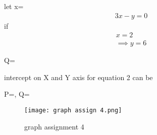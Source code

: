 \documentclass[journal,12pt,twocolumn]{IEEEtran}
\begin{document}
 let x=   
\begin{align}
 3x-y=0
 \end{align}
  if 
  \begin{align}
      x=2\\
      \implies y=6 
  \end{align}
  \begin{center}
      Q=
  \end{center}
  intercept on X and Y axis for equation 2 can be
  \begin{center}
      P=, Q=
  \end{center}
\begin{figure}[h]
    \centering
    \texttt{[image: graph assign 4.png]}
    \caption{graph assignment 4}
    \label{graph assign 4.png}
\end{figure}
\end{document}
